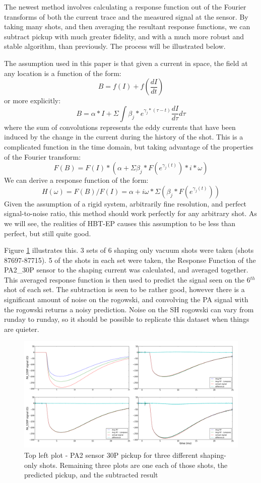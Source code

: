 \documentclass{article}
\begin{document}
The newest method involves calculating a response function out of the Fourier transforms of both the current trace and the measured signal at the sensor.  By taking many shots, and then averaging the resultant response functions, we can subtract pickup with much greater fidelity, and with a much more robust and stable algorithm, than previously.  The process will be illustrated below.\par
The assumption used in this paper is that given a current in space, the field at any location is a function of the form:$$B = f(I)+f(\frac{dI}{dt})$$
or more explicitly: 
$$B = \alpha*I+\Sigma \int \beta_j*e^{\gamma_j*(\tau-t)} \frac{dI}{d\tau} d\tau$$
where the sum of convolutions represents the eddy currents that have been induced by the change in the current during the history of the shot.  This is a complicated function in the time domain, but taking advantage of the properties of the Fourier transform:$$F(B) = F(I)*(\alpha+\Sigma \beta_j*F(e^{\gamma_j(t)})*i*\omega)$$
We can derive a response function of the form:
$$H(\omega) = F(B)/F(I) = \alpha+i\omega*\Sigma( \beta_j*F(e^{\gamma_j(t)}))$$
Given the assumption of a rigid system, arbitrarily fine resolution, and perfect signal-to-noise ratio, this method should work perfectly for any arbitrary shot.  As we will see, the realities of HBT-EP causes this assumption to be less than perfect, but still quite good.
\par
Figure \ref{RF_subtraction_results} illustrates this.  3 sets of 6 shaping only vacuum shots were taken (shots 87697-87715).  5 of the shots in each set were taken, the Response Function of the PA2\_30P sensor to the shaping current was calculated, and averaged together.  This averaged response function is then used to predict the signal seen on the 6$^{th}$ shot of each set.  The subtraction is seen to be rather good, however there is a significant amount of noise on the rogowski, and convolving the PA signal with the rogowski returns a noisy prediction.  Noise on the SH rogowski can vary from runday to runday, so it should be possible to replicate this dataset when things are quieter.
\begin{figure}[htb]
\includegraphics[width = \textwidth]{./RF_subtraction_results.png}\caption{Top left plot - PA2 sensor 30P pickup for three different shaping-only  shots.  Remaining three plots are one each of those shots, the predicted pickup, and the subtracted result}
\label{RF_subtraction_results}
\end{figure}
\par
\end{document}
